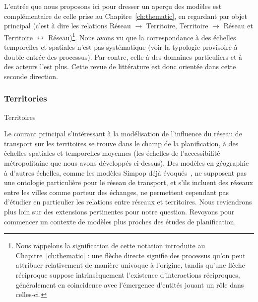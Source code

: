 

L'entrée que nous proposons ici pour dresser un aperçu des modèles est complémentaire de celle prise au Chapitre~\ref{ch:thematic}, en regardant par objet principal (c'est à dire les relations Réseau $\rightarrow$ Territoire, Territoire $\rightarrow$ Réseau et Territoire $\leftrightarrow$ Réseau)\footnote{Nous rappelons la signification de cette notation introduite au Chapitre~\ref{ch:thematic} : une flèche directe signifie des processus qu'on peut attribuer relativement de manière univoque à l'origine, tandis qu'une flèche réciproque suppose intrinsèquement l'existence d'interactions réciproques, généralement en coincidence avec l'émergence d'entités jouant un rôle dans celles-ci.}. Nous avons vu que la correspondance à des échelles temporelles et spatiales n'est pas systématique (voir la typologie provisoire à double entrée des processus). Par contre, celle à des domaines particuliers et à des acteurs l'est plus. Cette revue de littérature est donc orientée dans cette seconde direction.



\subsubsection{Territories}{Territoires}


Le courant principal s'intéressant à la modélisation de l'influence du réseau de transport sur les territoires se trouve dans le champ de la planification, à des échelles spatiales et temporelles moyennes (les échelles de l'accessibilité métropolitaine que nous avons développés ci-dessus). Des modèles en géographie à d'autres échelles, comme les modèles Simpop déjà évoqués~\cite{pumain2012multi}, ne supposent pas une ontologie particulière pour le réseau de transport, et s'ils incluent des réseaux entre les villes comme porteur des échanges, ne permettent cependant pas d'étudier en particulier les relations entre réseaux et territoires. Nous reviendrons plus loin sur des extensions pertinentes pour notre question. Revoyons pour commencer un contexte de modèles plus proches des études de planification.


